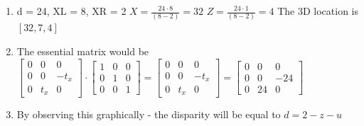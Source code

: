 \documentclass[11pt]{article}
\providecommand{\tightlist}{%
      \setlength{\itemsep}{0pt}\setlength{\parskip}{0pt}}
\begin{document}
    \begin{enumerate}
\def\labelenumi{\alph{enumi})}
\tightlist
\item
  d = 24, XL = 8, XR = 2 \(X = \frac{24 \cdot 8}{(8-2)} = 32\)
  \(Z = \frac{24 \cdot 1}{(8-2)} = 4\) The 3D location is \([32,7,4]\) 
\item
  The essential matrix would be
  \(\begin{bmatrix} 0 & 0 & 0 \\ 0 & 0 & -t_{x} \\ 0 & t_{x} & 0\end{bmatrix} \cdot \begin{bmatrix} 1 & 0 & 0 \\ 0 & 1 & 0 \\ 0 & 0 & 1\end{bmatrix} = \begin{bmatrix} 0 & 0 & 0 \\ 0 & 0 & -t_{x} \\ 0 & t_{x} & 0\end{bmatrix} = \begin{bmatrix} 0 & 0 & 0 \\ 0 & 0 & -24 \\ 0 & 24 & 0\end{bmatrix}\)
\item
  By observing this graphically - the disparity will be equal to
  \(d = 2 - z - u\)
\end{enumerate}
\end{document}
